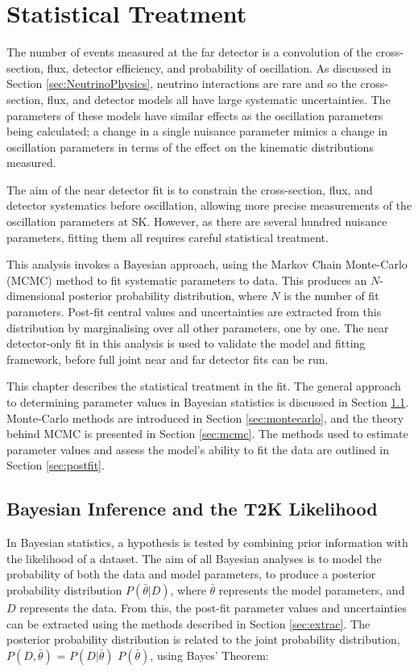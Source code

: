 \chapter{Statistical Treatment}\label{sec:stats}

The number of events measured at the far detector is a convolution of the cross-section, flux, detector efficiency, and probability of oscillation. As discussed in Section \ref{sec:NeutrinoPhysics}, neutrino interactions are rare and so the cross-section, flux, and detector models all have large systematic uncertainties. The parameters of these models have similar effects as the oscillation parameters being calculated; a change in a single nuisance parameter mimics a change in oscillation parameters in terms of the effect on the kinematic distributions measured.

The aim of the near detector fit is to constrain the cross-section, flux, and detector systematics before oscillation, allowing more precise measurements of the oscillation parameters at SK. However, as there are several hundred nuisance parameters, fitting them all requires careful statistical treatment.

This analysis invokes a Bayesian approach, using the Markov Chain Monte-Carlo (MCMC) method to fit systematic parameters to data. This produces an $N$-dimensional posterior probability distribution, where $N$ is the number of fit parameters. Post-fit central values and uncertainties are extracted from this distribution by marginalising over all other parameters, one by one. The near detector-only fit in this analysis is used to validate the model and fitting framework, before full joint near and far detector fits can be run. 

This chapter describes the statistical treatment in the fit. The general approach to determining parameter values in Bayesian statistics is discussed in Section \ref{sec:bayes}. Monte-Carlo methods are introduced in Section \ref{sec:montecarlo}, and the theory behind MCMC is presented in Section \ref{sec:mcmc}. The methods used to estimate parameter values and assess the model's ability to fit the data are outlined in Section \ref{sec:postfit}.

\section{Bayesian Inference and the T2K Likelihood}\label{sec:bayes}

In Bayesian statistics, a hypothesis is tested by combining prior information with the likelihood of a dataset. The aim of all Bayesian analyses is to model the probability of both the data and model parameters, to produce a posterior probability distribution $P(\bar{\theta}|D)$, where $\bar{\theta}$ represents the model parameters, and $D$ represents the data. From this, the post-fit parameter values and uncertainties can be extracted using the methods described in Section \ref{sec:extrac}. The posterior probability distribution is related to the joint probability distribution, $P(D,\bar{\theta})$ = $P(D|\bar{\theta})$ $P(\bar{\theta})$, using Bayes' Theorem:

